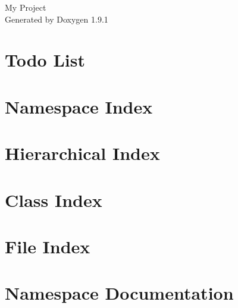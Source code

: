 \let\mypdfximage\pdfximage\def\pdfximage{\immediate\mypdfximage}\documentclass[twoside]{book}
\newcommand{\+}{\discretionary{\mbox{\scriptsize$\hookleftarrow$}}{}{}}
\newcommand{\clearemptydoublepage}{%
  \newpage{\pagestyle{empty}\cleardoublepage}%
}
\begin{document}
\raggedbottom

\hypersetup{pageanchor=false,
             bookmarksnumbered=true,
             pdfencoding=unicode
            }
\begin{titlepage}
\vspace*{7cm}
\begin{center}%
{\Large My Project }\\
\vspace*{1cm}
{\large Generated by Doxygen 1.9.1}\\
\end{center}
\end{titlepage}
\clearemptydoublepage
{}
\tableofcontents
\clearemptydoublepage
{}
\hypersetup{pageanchor=true}

\chapter{Todo List}
\label{todo}

\chapter{Namespace Index}

\chapter{Hierarchical Index}

\chapter{Class Index}

\chapter{File Index}

\chapter{Namespace Documentation}


















\end{document}
